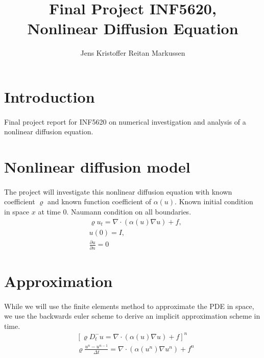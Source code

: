 \documentclass[11pt,a4paper]{article}
\author{Jens Kristoffer Reitan Markussen}
\title{Final Project INF5620,\\ Nonlinear Diffusion Equation}
\begin{document}
\maketitle

\section{Introduction}
\paragraph*{}
Final project report for INF5620 on numerical investigation and analysis of a nonlinear diffusion equation.

\section{Nonlinear diffusion model}
\paragraph*{}
The project will investigate this nonlinear diffusion equation with known coefficient $\varrho$ and known function coefficient of $\alpha(u)$. Known initial condition in space $x$ at time $0$. Naumann condition on all boundaries.
\begin{align}
& \varrho u_t = \nabla \cdot (\alpha(u)\nabla u) + f,\\
& u(0)=I,\\
& \frac{\partial u}{\partial n} = 0
\end{align}

\section{Approximation}
\paragraph*{} 
While we will use the finite elements method to approximate the PDE in space, we use the backwards euler scheme to derive an implicit approximation scheme in time.
\begin{align}
 & \left[\varrho D^-_t u  = \nabla \cdot (\alpha(u)\nabla u) + f\right]^n\\
 & \varrho \frac{u^n-u^{n-1}}{\Delta t} = \nabla \cdot (\alpha(u^n)\nabla u^n)+ f^n %
\end{align}
\end{document}
